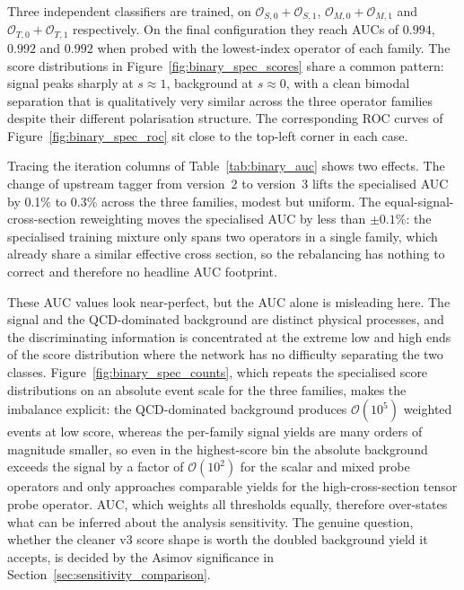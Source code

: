 Three independent classifiers are trained, on $\mathcal{O}_{S,0}+\mathcal{O}_{S,1}$, $\mathcal{O}_{M,0}+\mathcal{O}_{M,1}$ and $\mathcal{O}_{T,0}+\mathcal{O}_{T,1}$ respectively. On the final configuration they reach AUCs of $0.994$, $0.992$ and $0.992$ when probed with the lowest-index operator of each family. The score distributions in Figure~\ref{fig:binary_spec_scores} share a common pattern: signal peaks sharply at $s\approx1$, background at $s\approx0$, with a clean bimodal separation that is qualitatively very similar across the three operator families despite their different polarisation structure. The corresponding ROC curves of Figure~\ref{fig:binary_spec_roc} sit close to the top-left corner in each case.

Tracing the iteration columns of Table~\ref{tab:binary_auc} shows two effects. The change of upstream tagger from version~2 to version~3 lifts the specialised AUC by 0.1\% to 0.3\% across the three families, modest but uniform. The equal-signal-cross-section reweighting moves the specialised AUC by less than $\pm 0.1\%$: the specialised training mixture only spans two operators in a single family, which already share a similar effective cross section, so the rebalancing has nothing to correct and therefore no headline AUC footprint.

These AUC values look near-perfect, but the AUC alone is misleading here. The signal and the QCD-dominated background are distinct physical processes, and the discriminating information is concentrated at the extreme low and high ends of the score distribution where the network has no difficulty separating the two classes. Figure~\ref{fig:binary_spec_counts}, which repeats the specialised score distributions on an absolute event scale for the three families, makes the imbalance explicit: the QCD-dominated background produces $\mathcal{O}(10^5)$ weighted events at low score, whereas the per-family signal yields are many orders of magnitude smaller, so even in the highest-score bin the absolute background exceeds the signal by a factor of $\mathcal{O}(10^2)$ for the scalar and mixed probe operators and only approaches comparable yields for the high-cross-section tensor probe operator. AUC, which weights all thresholds equally, therefore over-states what can be inferred about the analysis sensitivity. The genuine question, whether the cleaner v3 score shape is worth the doubled background yield it accepts, is decided by the Asimov significance in Section~\ref{sec:sensitivity_comparison}.

